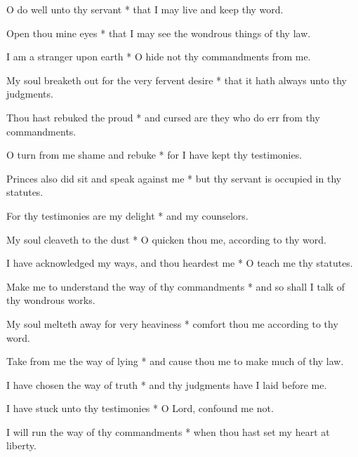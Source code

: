 O do well unto thy servant * that I may live and keep thy word.

Open thou mine eyes * that I may see the wondrous things of thy law.

I am a stranger upon earth * O hide not thy commandments from me.

My soul breaketh out for the very fervent desire * that it hath always unto thy judgments.

Thou hast rebuked the proud * and cursed are they who do err from thy commandments.

O turn from me shame and rebuke * for I have kept thy testimonies.

Princes also did sit and speak against me * but thy servant is occupied in thy statutes.

For thy testimonies are my delight * and my counselors.

My soul cleaveth to the dust * O quicken thou me, according to thy word.

I have acknowledged my ways, and thou heardest me * O teach me thy statutes.

Make me to understand the way of thy commandments * and so shall I talk of thy wondrous works.

My soul melteth away for very heaviness * comfort thou me according to thy word.

Take from me the way of lying * and cause thou me to make much of thy law.

I have chosen the way of truth * and thy judgments have I laid before me.

I have stuck unto thy testimonies * O Lord, confound me not.

I will run the way of thy commandments * when thou hast set my heart at liberty.